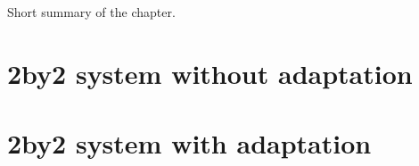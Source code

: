 Short summary of the chapter.

\section{2by2 system without adaptation}

\section{2by2 system with adaptation}


